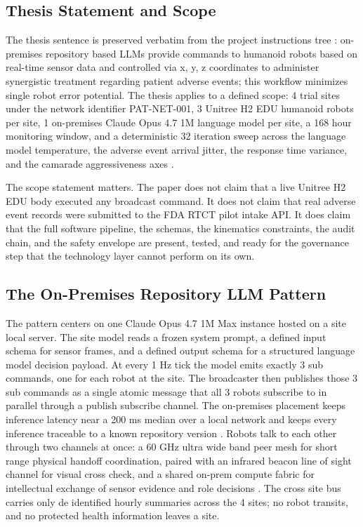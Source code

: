 \begin{sectionaccent}
\subsection{Thesis Statement and Scope}
\label{sec:intro-thesis}

The thesis sentence is preserved verbatim from the project
instructions tree \cite{kawchak_2026_humanoid_instructions}:
on-premises repository based LLMs provide commands to humanoid robots
based on real-time sensor data and controlled via x, y, z coordinates
to administer synergistic treatment regarding patient adverse events;
this workflow minimizes single robot error potential. The thesis
applies to a defined scope: 4 trial sites under the network
identifier PAT-NET-001, 3 Unitree H2 EDU humanoid robots per site, 1
on-premises Claude Opus 4.7 1M language model per site, a 168 hour
monitoring window, and a deterministic 32 iteration sweep across the
language model temperature, the adverse event arrival jitter, the
response time variance, and the camarade aggressiveness axes
\cite{unitree_h2_2026, nvidia_jetson_thor_2026,
anthropic_claude_opus_47_2026}.

The scope statement matters. The paper does not claim that a live
Unitree H2 EDU body executed any broadcast command. It does not claim
that real adverse event records were submitted to the FDA RTCT pilot
intake API. It does claim that the full software pipeline, the
schemas, the kinematics constraints, the audit chain, and the safety
envelope are present, tested, and ready for the governance step that
the technology layer cannot perform on its own.

\subsection{The On-Premises Repository LLM Pattern}
\label{sec:intro-onprem}

The pattern centers on one Claude Opus 4.7 1M Max instance hosted on
a site local server. The site model reads a frozen system prompt, a
defined input schema for sensor frames, and a defined output schema
for a structured language model decision payload. At every 1 Hz tick
the model emits exactly 3 sub commands, one for each robot at the
site. The broadcaster then publishes those 3 sub commands as a single
atomic message that all 3 robots subscribe to in parallel through a
publish subscribe channel. The on-premises placement keeps inference
latency near a 200 ms median over a local network and keeps every
inference traceable to a known repository version
\cite{anthropic_claude_code_2026, anthropic_claude_opus_47_2026}.
Robots talk to each other through two channels at once: a 60 GHz
ultra wide band peer mesh for short range physical handoff
coordination, paired with an infrared beacon line of sight channel
for visual cross check, and a shared on-prem compute fabric for
intellectual exchange of sensor evidence and role decisions
\cite{kawchak_2026_humanoid_instructions}. The cross site bus carries
only de identified hourly summaries across the 4 sites; no robot
transits, and no protected health information leaves a site.


\end{sectionaccent}
